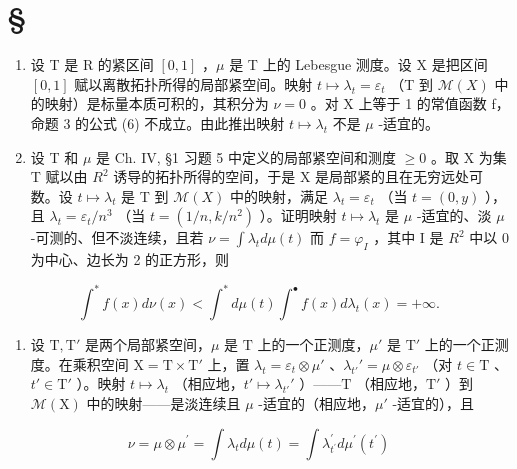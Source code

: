 \section*{\texorpdfstring{\S\CurrentExerciseGroup}{第{\CurrentExerciseGroup}节}}
{}

\begin{enumerate}
\def\labelenumi{\arabic{enumi})}
\item
  设 T 是 R 的紧区间 \([0,1]\) ，\(\mu\) 是 T 上的 Lebesgue 测度。设 X 是把区间 \([0,1]\) 赋以离散拓扑所得的局部紧空间。映射 \(t \mapsto \lambda_{t} = \varepsilon_{t}\) （T 到 \(\mathcal{M}(X)\) 中的映射）是标量本质可积的，其积分为 \(\nu = 0\) 。对 X 上等于 1 的常值函数 f，命题 3 的公式 (6) 不成立。由此推出映射 \(t \mapsto \lambda_{t}\) 不是 \(\mu\) -适宜的。
\item
  设 T 和 \(\mu\) 是 Ch. IV, §1 习题 5 中定义的局部紧空间和测度 \(\geqslant 0\) 。取 X 为集 T 赋以由 \(R^{2}\) 诱导的拓扑所得的空间，于是 X 是局部紧的且在无穷远处可数。设 \(t \mapsto \lambda_{t}\) 是 T 到 \(\mathcal{M}(X)\) 中的映射，满足 \(\lambda_{t} = \varepsilon_{t}\) （当 \(t = (0, y)\) ），且 \(\lambda_{t} = \varepsilon_{t}/n^{3}\) （当 \(t = (1/n, k/n^{2})\) ）。证明映射 \(t \mapsto \lambda_{t}\) 是 \(\mu\) -适宜的、淡 \(\mu\) -可测的、但不淡连续，且若 \(\nu = \int \lambda_{t} d\mu(t)\) 而 \(f = \varphi_{I}\) ，其中 I 是 \(R^{2}\) 中以 0 为中心、边长为 2 的正方形，则
\end{enumerate}

\[
\int^ {*} f (x) d \nu (x) <   \int^ {*} d \mu (t) \int^ {\bullet} f (x) d \lambda_ {t} (x) = + \infty .
\]

\begin{enumerate}
\def\labelenumi{\arabic{enumi})}
\setcounter{enumi}{2}
\tightlist
\item
  设 \(\mathrm{T}, \mathrm{T}'\) 是两个局部紧空间，\(\mu\) 是 \(\mathrm{T}\) 上的一个正测度，\(\mu'\) 是 \(\mathrm{T}'\) 上的一个正测度。在乘积空间 \(\mathrm{X} = \mathrm{T} \times \mathrm{T}'\) 上，置 \(\lambda_t = \varepsilon_t \otimes \mu'\) 、\(\lambda_{t'}' = \mu \otimes \varepsilon_{t'}\) （对 \(t \in \mathrm{T}\) 、\(t' \in \mathrm{T}'\) ）。映射 \(t \mapsto \lambda_t\) （相应地，\(t' \mapsto \lambda_{t'}'\) ）——\(\mathrm{T}\) （相应地，\(\mathrm{T}'\) ）到 \(\mathcal{M}(\mathrm{X})\) 中的映射——是淡连续且 \(\mu\) -适宜的（相应地，\(\mu'\) -适宜的），且
\end{enumerate}

\[
\nu = \mu \otimes \mu^ {\prime} = \int \lambda_ {t} d \mu (t) = \int \lambda_ {t ^ {\prime}} ^ {\prime} d \mu^ {\prime} (t ^ {\prime})
\]

